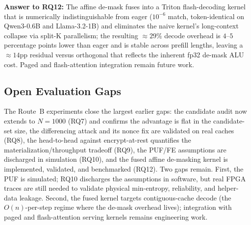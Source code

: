 \textbf{Answer to RQ12:} The affine de-mask fuses into a Triton flash-decoding kernel that is numerically indistinguishable from eager ($10^{-6}$ match, token-identical on Qwen3-0.6B and Llama-3.2-1B) and eliminates the naive kernel's long-context collapse via split-K parallelism; the resulting $\approx 29\%$ decode overhead is $4$--$5$ percentage points lower than eager and is stable across prefill lengths, leaving a $\approx 14$pp residual versus orthogonal that reflects the inherent fp32 de-mask ALU cost. Paged and flash-attention integration remain future work.

\subsection{Open Evaluation Gaps}

The Route~B experiments close the largest earlier gaps: the candidate audit now extends to $N=1000$ (RQ7) and confirms the advantage is flat in the candidate-set size, the differencing attack and its nonce fix are validated on real caches (RQ8), the head-to-head against encrypt-at-rest quantifies the materialization/throughput tradeoff (RQ9), the PUF/FE assumptions are discharged in simulation (RQ10), and the fused affine de-masking kernel is implemented, validated, and benchmarked (RQ12). Two gaps remain. First, the PUF is simulated; RQ10 discharges the assumptions in software, but real FPGA traces are still needed to validate physical min-entropy, reliability, and helper-data leakage. Second, the fused kernel targets contiguous-cache decode (the $O(n)$-per-step regime where the de-mask overhead lives); integration with paged and flash-attention serving kernels remains engineering work.
